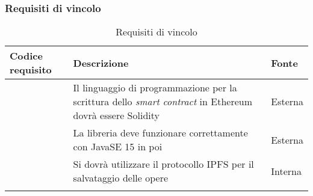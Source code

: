 \subsubsection{Requisiti di vincolo}
\begin{longtabu}{|X[0.8,c]|X[3,c]|X[0.5,c]|}

  \hline 

  \textbf{Codice requisito} & \textbf{Descrizione} & \textbf{Fonte} \\

  \hline

   & Il linguaggio di programmazione per la scrittura dello \textit{smart contract} in Ethereum dovrà essere Solidity & Esterna \\ 
  
  \hline

   & La libreria deve funzionare correttamente con JavaSE 15 in poi & Esterna \\
  
  \hline

   & Si dovrà utilizzare il protocollo IPFS per il salvataggio delle opere & Interna \\
  
  \hline

  \caption{Requisiti di vincolo}
\end{longtabu}
